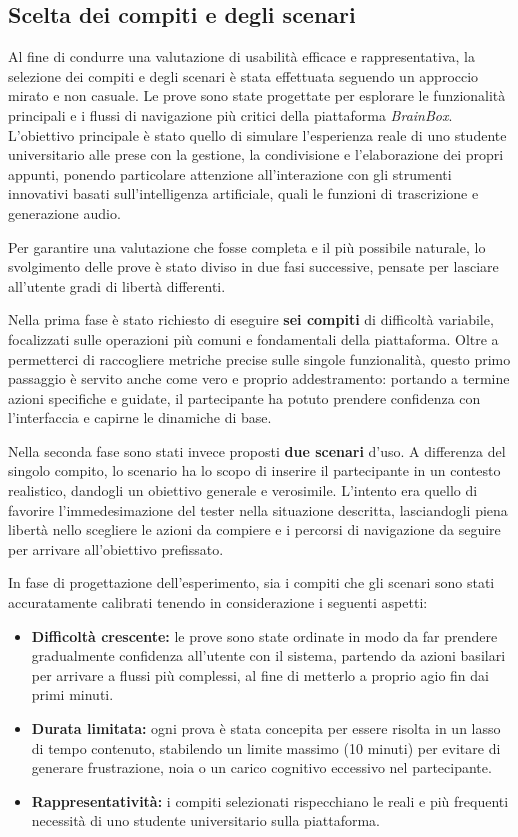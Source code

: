 \subsection{Scelta dei compiti e degli scenari}
Al fine di condurre una valutazione di usabilità efficace e rappresentativa, la selezione dei compiti e degli scenari è stata effettuata seguendo un approccio mirato e non casuale. Le prove sono state progettate per esplorare le funzionalità principali e i flussi di navigazione più critici della piattaforma \textit{BrainBox}. L'obiettivo principale è stato quello di simulare l'esperienza reale di uno studente universitario alle prese con la gestione, la condivisione e l'elaborazione dei propri appunti, ponendo particolare attenzione all'interazione con gli strumenti innovativi basati sull'intelligenza artificiale, quali le funzioni di trascrizione e generazione audio.

Per garantire una valutazione che fosse completa e il più possibile naturale, lo svolgimento delle prove è stato diviso in due fasi successive, pensate per lasciare all'utente gradi di libertà differenti.

Nella prima fase è stato richiesto di eseguire \textbf{sei compiti} di difficoltà variabile, focalizzati sulle operazioni più comuni e fondamentali della piattaforma. Oltre a permetterci di raccogliere metriche precise sulle singole funzionalità, questo primo passaggio è servito anche come vero e proprio addestramento: portando a termine azioni specifiche e guidate, il partecipante ha potuto prendere confidenza con l'interfaccia e capirne le dinamiche di base.

Nella seconda fase sono stati invece proposti \textbf{due scenari} d'uso. A differenza del singolo compito, lo scenario ha lo scopo di inserire il partecipante in un contesto realistico, dandogli un obiettivo generale e verosimile. L'intento era quello di favorire l'immedesimazione del tester nella situazione descritta, lasciandogli piena libertà nello scegliere le azioni da compiere e i percorsi di navigazione da seguire per arrivare all'obiettivo prefissato.

In fase di progettazione dell'esperimento, sia i compiti che gli scenari sono stati accuratamente calibrati tenendo in considerazione i seguenti aspetti:
\begin{itemize}
    \item \textbf{Difficoltà crescente:} le prove sono state ordinate in modo da far prendere gradualmente confidenza all'utente con il sistema, partendo da azioni basilari per arrivare a flussi più complessi, al fine di metterlo a proprio agio fin dai primi minuti.
    \item \textbf{Durata limitata:} ogni prova è stata concepita per essere risolta in un lasso di tempo contenuto, stabilendo un limite massimo (10 minuti) per evitare di generare frustrazione, noia o un carico cognitivo eccessivo nel partecipante.
    \item \textbf{Rappresentatività:} i compiti selezionati rispecchiano le reali e più frequenti necessità di uno studente universitario sulla piattaforma.
\end{itemize}

